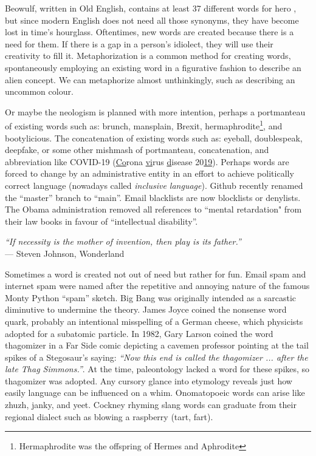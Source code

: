 Beowulf, written in Old English, contains at least 37 different words for hero \cite{jespersen1919growth}, but since modern English does not need all those synonyms, they have become lost in time's hourglass. Oftentimes, new words are created because there is a need for them. If there is a gap in a person's idiolect, they will use their creativity to fill it. Metaphorization is a common method for creating words, spontaneously employing an existing word in a figurative fashion to describe an alien concept. We can metaphorize almost unthinkingly, such as describing an uncommon colour. 


Or maybe the neologism is planned with more intention, perhaps a portmanteau of existing words such as: brunch, mansplain, Brexit, hermaphrodite\footnote{Hermaphrodite was the offspring of Hermes and Aphrodite}, and bootylicious. The concatenation of existing words such as: eyeball, doublespeak, deepfake, or some other mishmash of portmanteau, concatenation, and abbreviation like COVID-19 (\underline{Co}rona \underline{vi}rus \underline{d}isease 20\underline{19}). Perhaps words are forced to change by an administrative entity in an effort to achieve politically correct language (nowadays called \textit{inclusive language}). Github recently renamed the ``master'' branch to ``main''. Email blacklists are now blocklists or denylists. The Obama administration removed all references to ``mental retardation" from their law books in favour of ``intellectual disability''.

\begin{center}
\textit{``If necessity is the mother of invention, then play is its father.''}
\\ --- Steven Johnson, Wonderland
\end{center}

Sometimes a word is created not out of need but rather for fun. Email spam and internet spam were named after the repetitive and annoying nature of the famous Monty Python ``spam'' sketch. Big Bang was originally intended as a sarcastic diminutive to undermine the theory. James Joyce coined the nonsense word quark, probably an intentional misspelling of a German cheese, which physicists adopted for a subatomic particle. In 1982, Gary Larson coined the word thagomizer in a Far Side comic depicting a cavemen professor pointing at the tail spikes of a Stegosaur's saying: \textit{``Now this end is called the thagomizer ... after the late Thag Simmons.''}. At the time, paleontology lacked a word for these spikes, so thagomizer was adopted. Any cursory glance into etymology reveals just how easily language can be influenced on a whim. Onomatopoeic words can arise like zhuzh, janky, and yeet. Cockney rhyming slang words can graduate from their regional dialect such as blowing a raspberry (tart, fart).

